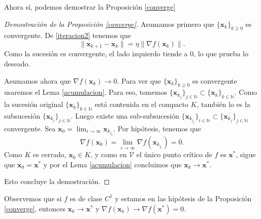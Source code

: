 \documentclass[12pt, a4paper]{amsbook}
\newcommand{\N}{{\mathbb N}}
\newcommand{\Vc}{{\mathcal V}}
\newcommand{\xx}{{\mathbf x}}
\theoremstyle{remark}
\theoremstyle{definition}
\numberwithin{section}{chapter}
\numberwithin{subsection}{section}
\numberwithin{equation}{section}
\numberwithin{figure}{chapter}
\begin{document}
Ahora sí, podemos demostrar la Proposición \ref{converge}
\begin{proof}[Demostración de la Proposición \ref{converge}]
Asumamos primero que $\{\xx_k\}_{k\ge 0}$ es convergente. De \eqref{iteracion2} tenemos que
$$
\|\xx_{k+1}-\xx_k\| = \eta \|\nabla f(\xx_k)\|.
$$
Como la sucesión es convergente, el lado izquierdo tiende a 0, lo que prueba lo deseado. 

Asumamos ahora que $\nabla f(\xx_k)\to 0$. Para ver que $\{\xx_k\}_{k\ge 0}$ es convergente usaremos el Lema \ref{acumulacion}. Para eso, tomemos $\{\xx_{k_j}\}_{j\in\N}\subset \{\xx_k\}_{k\in\N}$. Como la sucesión original $\{\xx_k\}_{k\in\N}$ está contenida en el compacto $K$, también lo es la subsucesión  $\{\xx_{k_j}\}_{j\in\N}$. Luego existe una sub-subsucesión $\{\xx_{k_{j_i}}\}_{i\in\N}\subset \{\xx_{k_j}\}_{j\in\N}$ convergente. Sea $\xx_0 = \lim_{i\to\infty} \xx_{k_{j_i}}$. Por hipótesis, tenemos que 
$$
\nabla f(\xx_0) = \lim_{i\to\infty}\nabla f(\xx_{k_{j_i}}) = 0.
$$
Como $K$ es cerrado, $\xx_0\in K$, y como en $\Vc$ el único punto crítico de $f$ es $\xx^*$, sigue que $\xx_0=\xx^*$ y por el Lema \ref{acumulacion} concluimos que $\xx_k\to\xx^*$.

Esto concluye la demostración.
\end{proof}

Observemos que si $f$ es de clase $C^1$ y estamos en las hipótesis de la Proposición \ref{converge}, entonces $\xx_k\to \xx^*$ y $\nabla f(\xx_k)\to \nabla f(\xx^*) = 0$.
\end{document}
